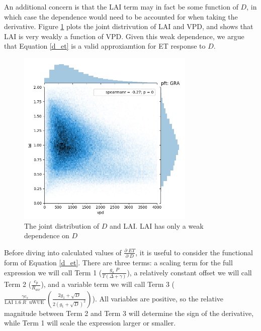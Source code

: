 \documentclass[draft,linenumbers]{agujournal}
\begin{document}
An additional concern is that the LAI term may in fact be some function of $D$, in which case the dependence would need to be accounted for when taking the derivative. Figure \ref{lai_vpd_fig} plots the joint distrivution of LAI and VPD, and shows that LAI is very weakly a function of VPD. Given this weak dependence, we argue that Equation \ref{d_et} is a valid approxiamtion for ET response to $D$.

 
\begin{figure}[h]
\centering
\includegraphics[width=20pc]{./fig03.png}
\caption{The joint distribution of $D$ and LAI. LAI has only a weak dependence on $D$}
\label{lai_vpd_fig}
\end{figure}


Before diving into calculated values of $\frac{\partial \; ET}{\partial \; D}$, it is useful to consider the functional form of Equation \ref{d_et}. There are three terms: a scaling term for the full expression we will call Term 1 ($\frac{g_a \; P}{T(\Delta + \gamma)}$), a relatively constant offset we will call Term 2 ($\frac{c_p}{R_{air}}$), and a variable term we will call Term 3 ($\frac{\gamma c_s }{\text{LAI }1.6 \; R\; \text{ uWUE }} \left( \frac{2 g_1 + \sqrt{D}}{2 (g_1 + \sqrt{D})^2}\right)$). All variables are positive, so the relative magnitude between Term 2 and Term 3 will determine the sign of the derivative, while Term 1 will scale the expression larger or smaller.
\end{document}
